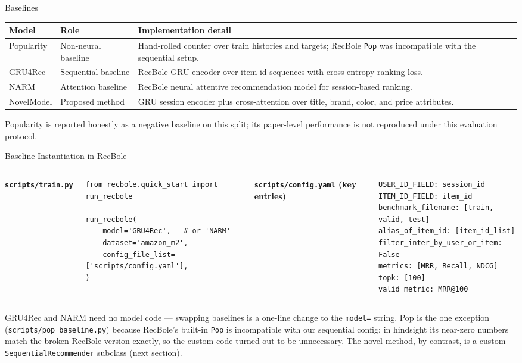 \documentclass[10pt,aspectratio=169]{beamer}
\newcommand{\code}[1]{\texttt{#1}}
\begin{document}
\begin{frame}{Baselines}
  \begin{tabular}{p{}p{}p{}}
    \toprule
    Model & Role & Implementation detail \\
    \midrule
    Popularity & Non-neural baseline & Hand-rolled counter over train histories and targets; RecBole \code{Pop} was incompatible with the sequential setup. \\
    GRU4Rec & Sequential baseline & RecBole GRU encoder over item-id sequences with cross-entropy ranking loss. \\
    NARM & Attention baseline & RecBole neural attentive recommendation model for session-based ranking. \\
    NovelModel & Proposed method & GRU session encoder plus cross-attention over title, brand, color, and price attributes. \\
    \bottomrule
  \end{tabular}

  \vspace{0.8em}
  \footnotesize Popularity is reported honestly as a negative baseline on this split; its paper-level performance is not reproduced under this evaluation protocol.
\end{frame}

\begin{frame}[fragile]{Baseline Instantiation in RecBole}
\vspace{-0.4em}
\begin{columns}[T,onlytextwidth]
    \textbf{\code{scripts/train.py}}\\[0.3em]
    \scriptsize
\begin{verbatim}
from recbole.quick_start import run_recbole

run_recbole(
    model='GRU4Rec',   # or 'NARM'
    dataset='amazon_m2',
    config_file_list=['scripts/config.yaml'],
)
\end{verbatim}

    \textbf{\code{scripts/config.yaml} (key entries)}\\[0.3em]
    \scriptsize
\begin{verbatim}
USER_ID_FIELD: session_id
ITEM_ID_FIELD: item_id
benchmark_filename: [train, valid, test]
alias_of_item_id: [item_id_list]
filter_inter_by_user_or_item: False
metrics: [MRR, Recall, NDCG]
topk: [100]
valid_metric: MRR@100
\end{verbatim}
\end{columns}

\vspace{0.4em}
\footnotesize GRU4Rec and NARM need no model code --- swapping baselines is a one-line change to the \code{model=} string. Pop is the one exception (\code{scripts/pop\_baseline.py}) because RecBole's built-in \code{Pop} is incompatible with our sequential config; in hindsight its near-zero numbers match the broken RecBole version exactly, so the custom code turned out to be unnecessary. The novel method, by contrast, is a custom \code{SequentialRecommender} subclass (next section).
\end{frame}
\end{document}
